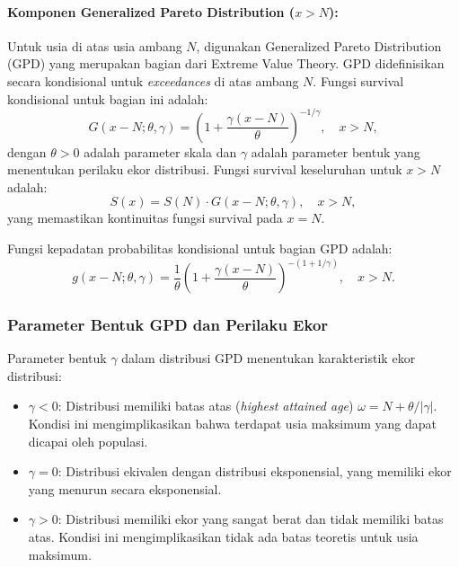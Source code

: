 \paragraph{Komponen Generalized Pareto Distribution ($x > N$):}
Untuk usia di atas usia ambang $N$, digunakan Generalized Pareto Distribution (GPD) yang merupakan bagian dari Extreme Value Theory. GPD didefinisikan secara kondisional untuk \textit{exceedances} di atas ambang $N$. Fungsi survival kondisional untuk bagian ini adalah:
\begin{equation}
G(x-N; \theta, \gamma) = \left(1 + \frac{\gamma(x-N)}{\theta}\right)^{-1/\gamma}, \quad x > N,
\label{eq:gpd_survival_conditional}
\end{equation}
dengan $\theta > 0$ adalah parameter skala dan $\gamma$ adalah parameter bentuk yang menentukan perilaku ekor distribusi. Fungsi survival keseluruhan untuk $x > N$ adalah:
\begin{equation}
S(x) = S(N) \cdot G(x-N; \theta, \gamma), \quad x > N,
\label{eq:tlt_gpd_survival}
\end{equation}
yang memastikan kontinuitas fungsi survival pada $x = N$.

Fungsi kepadatan probabilitas kondisional untuk bagian GPD adalah:
\begin{equation}
g(x-N; \theta, \gamma) = \frac{1}{\theta}\left(1 + \frac{\gamma(x-N)}{\theta}\right)^{-(1+1/\gamma)}, \quad x > N.
\label{eq:gpd_pdf_conditional}
\end{equation}

\subsubsection{Parameter Bentuk GPD dan Perilaku Ekor}

Parameter bentuk $\gamma$ dalam distribusi GPD menentukan karakteristik ekor distribusi:

\begin{itemize}
    \item \textbf{$\gamma < 0$}: Distribusi memiliki batas atas (\textit{highest attained age}) $\omega = N + \theta/|\gamma|$. Kondisi ini mengimplikasikan bahwa terdapat usia maksimum yang dapat dicapai oleh populasi.
    
    \item \textbf{$\gamma = 0$}: Distribusi ekivalen dengan distribusi eksponensial, yang memiliki ekor yang menurun secara eksponensial.
    
    \item \textbf{$\gamma > 0$}: Distribusi memiliki ekor yang sangat berat dan tidak memiliki batas atas. Kondisi ini mengimplikasikan tidak ada batas teoretis untuk usia maksimum.
\end{itemize}

